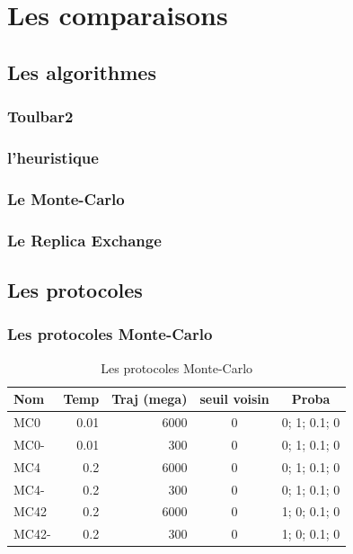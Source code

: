  
\chapter{Les comparaisons}
\label{chap:resultats_comparaisons}

 
\section{Les algorithmes} 

   \subsection{Toulbar2} 
   \subsection{l'heuristique} 
   \subsection{Le Monte-Carlo}
   \subsection{Le Replica Exchange}
 
   \section{Les protocoles} 



   \subsection{Les protocoles Monte-Carlo} 
    
    \begin{table}[!htbp]
      \centering

      \begin{tabular}{|l|r|r|c|c|}

        \hline
        Nom & Temp & Traj (mega)& seuil voisin  & Proba \\
        \hline
        MC0   & 0.01  &  6000 & 0 & 0; 1; 0.1; 0   \\  
        MC0-  & 0.01  &   300 & 0 & 0; 1; 0.1; 0   \\  
        MC4   & 0.2   &  6000 & 0 & 0; 1; 0.1; 0   \\          
        MC4-  & 0.2   &   300 & 0 & 0; 1; 0.1; 0   \\ 
        MC42  & 0.2   &  6000 & 0 & 1; 0; 0.1; 0   \\        
        MC42- & 0.2   &   300 & 0 & 1; 0; 0.1; 0   \\   \hline                   

       
      \end{tabular}      
      \caption{Les protocoles Monte-Carlo}
      \label{tab_protoMC}      
    \end{table}

